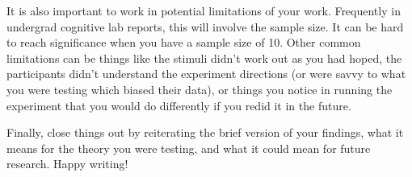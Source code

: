 \documentclass[stu,12pt,floatsintext]{apa7}
\begin{document}
It is also important to work in potential limitations of your work. Frequently in undergrad cognitive lab reports, this will involve the sample size. It can be hard to reach significance when you have a sample size of 10. Other common limitations can be things like the stimuli didn't work out as you had hoped, the participants didn't understand the experiment directions (or were savvy to what you were testing which biased their data), or things you notice in running the experiment that you would do differently if you redid it in the future.

Finally, close things out by reiterating the brief version of your findings, what it means for the theory you were testing, and what it could mean for future research. Happy writing!



\printbibliography
\end{document}
